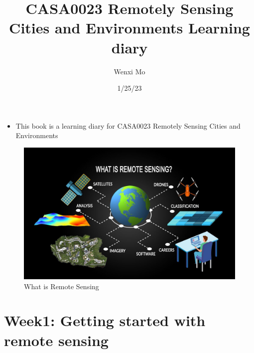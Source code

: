 \documentclass[
  letterpaper,
  DIV=11,
  numbers=noendperiod]{scrreprt}
\title{CASA0023 Remotely Sensing Cities and Environments Learning diary}
\author{Wenxi Mo}
\date{1/25/23}
\providecommand{\tightlist}{%
  \setlength{\itemsep}{0pt}\setlength{\parskip}{0pt}}\usepackage{longtable,booktabs,array}
\renewcommand*\contentsname{Table of contents}
\newcommand\contentsname{Table of contents}
\begin{document}
\maketitle
\ifdefined\Shaded\renewenvironment{Shaded}{\begin{tcolorbox}[boxrule=0pt, enhanced, sharp corners, borderline west={3pt}{0pt}{shadecolor}, interior hidden, frame hidden, breakable]}{\end{tcolorbox}}\fi

\renewcommand*\contentsname{Table of contents}
{
\hypersetup{linkcolor=}
\setcounter{tocdepth}{2}
\tableofcontents
}

\hypertarget{section}{%
\chapter{}\label{section}}

\begin{itemize}
\tightlist
\item
  This book is a learning diary for CASA0023 Remotely Sensing Cities and
  Environments
\end{itemize}

\begin{figure}

{\centering \includegraphics{./image/remote.jpg}

}

\caption{What is Remote Sensing}

\end{figure}


\hypertarget{sec-week1-getting-started-with-remote-sensing}{%
\chapter{Week1: Getting started with remote
sensing}\label{sec-week1-getting-started-with-remote-sensing}}
\end{document}
